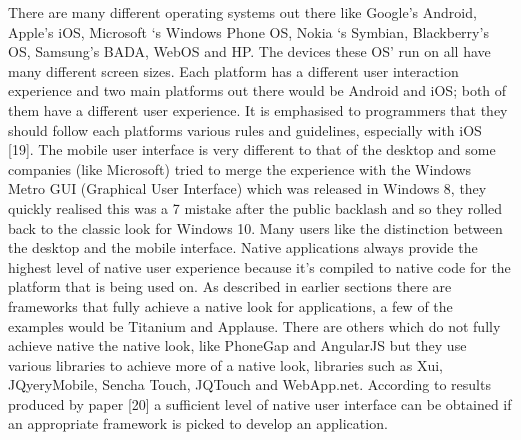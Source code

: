 There are many different operating systems out there like Google’s
Android, Apple’s iOS, Microsoft ‘s Windows Phone OS, Nokia ‘s Symbian,
Blackberry’s OS, Samsung’s BADA, WebOS and HP. The devices these OS’ run
on all have many different screen sizes. Each platform has a different user
interaction experience and two main platforms out there would be Android
and iOS; both of them have a different user experience. It is emphasised to
programmers that they should follow each platforms various rules and
guidelines, especially with iOS [19]. The mobile user interface is very
different to that of the desktop and some companies (like Microsoft) tried to
merge the experience with the Windows Metro GUI (Graphical User
Interface) which was released in Windows 8, they quickly realised this was a
7
mistake after the public backlash and so they rolled back to the classic look
for Windows 10. Many users like the distinction between the desktop and the
mobile interface. Native applications always provide the highest level of
native user experience because it’s compiled to native code for the platform
that is being used on. As described in earlier sections there are frameworks
that fully achieve a native look for applications, a few of the examples would
be Titanium and Applause. There are others which do not fully achieve native
the native look, like PhoneGap and AngularJS but they use various libraries
to achieve more of a native look, libraries such as Xui, JQyeryMobile, Sencha
Touch, JQTouch and WebApp.net. According to results produced by paper
[20] a sufficient level of native user interface can be obtained if an
appropriate framework is picked to develop an application.

